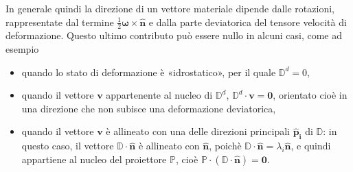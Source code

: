\documentclass[letterpaper,10pt,italian]{jupyterBook}
\begin{document}
In generale quindi la direzione di un vettore materiale dipende dalle
rotazioni, rappresentate dal termine
\(\frac{1}{2} \mathbf{\omega} \times \mathbf{\hat{n}}\) e dalla parte deviatorica
del tensore velocità di deformazione. Questo ultimo contributo può
essere nullo in alcuni casi, come ad esempio
\begin{itemize}
\item {} 
\sphinxAtStartPar
quando lo stato di deformazione è «idrostatico», per il quale
\(\mathbb{D}^d = 0\),

\item {} 
\sphinxAtStartPar
quando il vettore \(\mathbf{v}\) appartenente al nucleo di \(\mathbb{D}^d\),
\(\mathbb{D}^d \cdot \mathbf{v} = \mathbf{0}\), orientato cioè in una
direzione che non subisce una deformazione deviatorica,

\item {} 
\sphinxAtStartPar
quando il vettore \(\mathbf{v}\) è allineato con una delle direzioni
principali \(\mathbf{\hat{p}_i}\) di \(\mathbb{D}\): in questo caso, il
vettore \(\mathbb{D} \cdot \mathbf{\hat{n}}\) è allineato con
\(\mathbf{\hat{n}}\), poichè
\(\mathbb{D} \cdot \mathbf{\hat{n}} = \lambda_i \mathbf{\hat{n}}\), e quindi
appartiene al nucleo del proiettore \(\mathbb{P}\), cioè
\(\mathbb{P} \cdot (\mathbb{D} \cdot \mathbf{\hat{n}}) = \mathbf{0}\).

\end{itemize}
\end{document}
